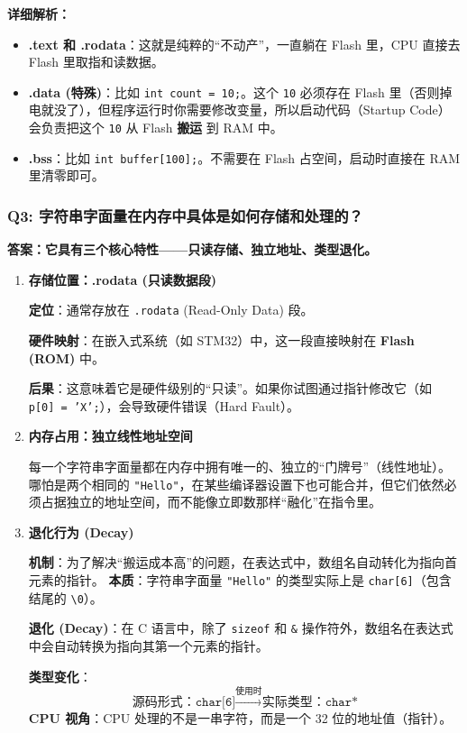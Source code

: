 \textbf{详细解析：}
\begin{itemize}
    \item \textbf{.text 和 .rodata}：这就是纯粹的“不动产”，一直躺在 Flash 里，CPU 直接去 Flash 里取指和读数据。
    \item \textbf{.data (特殊)}：比如 \texttt{int count = 10;}。这个 \texttt{10} 必须存在 Flash 里（否则掉电就没了），但程序运行时你需要修改变量，所以启动代码（Startup Code）会负责把这个 \texttt{10} 从 Flash \textbf{搬运} 到 RAM 中。
    \item \textbf{.bss}：比如 \texttt{int buffer[100];}。不需要在 Flash 占空间，启动时直接在 RAM 里清零即可。
\end{itemize}


\subsubsection{Q3: 字符串字面量在内存中具体是如何存储和处理的？}

\textbf{答案：它具有三个核心特性——只读存储、独立地址、类型退化。}

\begin{enumerate}[label=\ding{\numexpr171+\arabic*}]
    \item \textbf{存储位置：.rodata (只读数据段)}

    \textbf{定位}：通常存放在 \texttt{.rodata} (Read-Only Data) 段。

    \textbf{硬件映射}：在嵌入式系统（如 STM32）中，这一段直接映射在 \textbf{Flash (ROM)} 中。
    
    \textbf{后果}：这意味着它是硬件级别的“只读”。如果你试图通过指针修改它（如 \texttt{p[0] = 'X';}），会导致硬件错误（Hard Fault）。

    \item \textbf{内存占用：独立线性地址空间}

    每一个字符串字面量都在内存中拥有唯一的、独立的“门牌号”（线性地址）。
    哪怕是两个相同的 \texttt{"Hello"}，在某些编译器设置下也可能合并，但它们依然必须占据独立的地址空间，而不能像立即数那样“融化”在指令里。
\newpage
    \item \textbf{退化行为 (Decay)}

    \textbf{机制}：为了解决“搬运成本高”的问题，在表达式中，数组名自动转化为指向首元素的指针。
    \textbf{本质}：字符串字面量 \texttt{"Hello"} 的类型实际上是 \texttt{char[6]}（包含结尾的 \texttt{\textbackslash 0}）。
        
        \textbf{退化 (Decay)}：在 C 语言中，除了 \texttt{sizeof} 和 \texttt{\&} 操作符外，数组名在表达式中会自动转换为指向其第一个元素的指针。
    
    \textbf{类型变化}：
    \[ \text{源码形式：} \texttt{char[6]} \xrightarrow{\text{使用时}} \text{实际类型：} \texttt{char*} \]
    \textbf{CPU 视角}：CPU 处理的不是一串字符，而是一个 32 位的地址值（指针）。
\end{enumerate}


